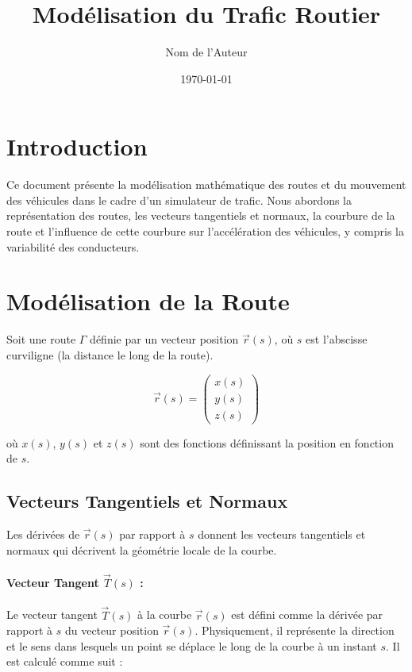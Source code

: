 \documentclass[a4paper,12pt]{article}
\title{Modélisation du Trafic Routier}
\author{Nom de l'Auteur}
\date{\today}
\begin{document}
\maketitle

\section{Introduction}

Ce document présente la modélisation mathématique des routes et du mouvement des véhicules dans le cadre d'un simulateur de trafic. Nous abordons la représentation des routes, les vecteurs tangentiels et normaux, la courbure de la route et l'influence de cette courbure sur l'accélération des véhicules, y compris la variabilité des conducteurs.

\section{Modélisation de la Route}

Soit une route \(\Gamma\) définie par un vecteur position \(\vec{r}(s)\), où \(s\) est l'abscisse curviligne (la distance le long de la route).

\[
\vec{r}(s) = \begin{pmatrix}
x(s) \\
y(s) \\
z(s)
\end{pmatrix}
\]

où \(x(s)\), \(y(s)\) et \(z(s)\) sont des fonctions définissant la position en fonction de \(s\).

\subsection{Vecteurs Tangentiels et Normaux}

Les dérivées de \(\vec{r}(s)\) par rapport à \(s\) donnent les vecteurs tangentiels et normaux qui décrivent la géométrie locale de la courbe.

\paragraph{Vecteur Tangent \(\vec{T}(s)\) :}

Le vecteur tangent \(\vec{T}(s)\) à la courbe \(\vec{r}(s)\) est défini comme la dérivée par rapport à \(s\) du vecteur position \(\vec{r}(s)\). Physiquement, il représente la direction et le sens dans lesquels un point se déplace le long de la courbe à un instant \(s\). Il est calculé comme suit :
\end{document}
